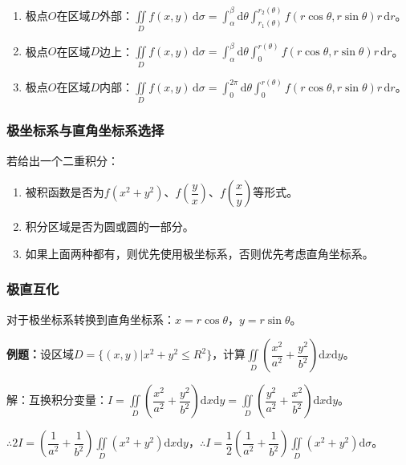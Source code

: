 \documentclass[UTF8, 12pt]{ctexart}
\begin{document}
\begin{enumerate}
    \item 极点$O$在区域$D$外部：$\iint\limits_Df(x,y)\,\textrm{d}\sigma=\int_\alpha^\beta\textrm{d}\theta\int_{r_1(\theta)}^{r_2(\theta)}f(r\cos\theta,r\sin\theta)r\,\textrm{d}r$。
    \item 极点$O$在区域$D$边上：$\iint\limits_Df(x,y)\,\textrm{d}\sigma=\int_\alpha^\beta\textrm{d}\theta\int_0^{r(\theta)}f(r\cos\theta,r\sin\theta)r\,\textrm{d}r$。
    \item 极点$O$在区域$D$内部：$\iint\limits_Df(x,y)\,\textrm{d}\sigma=\int_0^{2\pi}\textrm{d}\theta\int_0^{r(\theta)}f(r\cos\theta,r\sin\theta)r\,\textrm{d}r$。
\end{enumerate}

\subsubsection{极坐标系与直角坐标系选择}

若给出一个二重积分：

\begin{enumerate}
    \item 被积函数是否为$f(x^2+y^2)$、$f\left(\dfrac{y}{x}\right)$、$f\left(\dfrac{x}{y}\right)$等形式。
    \item 积分区域是否为圆或圆的一部分。
    \item 如果上面两种都有，则优先使用极坐标系，否则优先考虑直角坐标系。
\end{enumerate}

\subsubsection{极直互化}

对于极坐标系转换到直角坐标系：$x=r\cos\theta$，$y=r\sin\theta$。

\textbf{例题：}设区域$D=\{(x,y)|x^2+y^2\leqslant R^2\}$，计算$\displaystyle{\iint\limits_D\left(\dfrac{x^2}{a^2}+\dfrac{y^2}{b^2}\right)\textrm{d}x\textrm{d}y}$。

解：互换积分变量：$I=\displaystyle{\iint\limits_D\left(\dfrac{x^2}{a^2}+\dfrac{y^2}{b^2}\right)\textrm{d}x\textrm{d}y}=\displaystyle{\iint\limits_D\left(\dfrac{y^2}{a^2}+\dfrac{x^2}{b^2}\right)\textrm{d}x\textrm{d}y}$。

$\therefore2I=\left(\dfrac{1}{a^2}+\dfrac{1}{b^2}\right)\displaystyle{\iint\limits_D(x^2+y^2)\textrm{d}x\textrm{d}y}$，$\therefore I=\dfrac{1}{2}\left(\dfrac{1}{a^2}+\dfrac{1}{b^2}\right)\displaystyle{\iint\limits_D(x^2+y^2)\textrm{d}\sigma}$。
\end{document}
